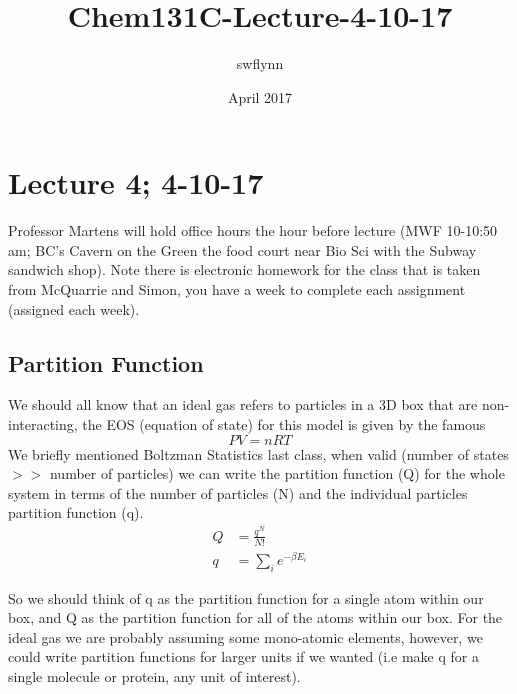 \documentclass{article}
\title{Chem131C-Lecture-4-10-17}
\author{swflynn }
\date{April 2017}
\begin{document}
\maketitle

\section*{Lecture 4; 4-10-17}
 Professor Martens will hold office hours the hour before lecture (MWF 10-10:50 am; BC’s Cavern on the Green the food court near Bio Sci with the Subway sandwich shop).
 Note there is electronic homework for the class that is taken from McQuarrie and Simon, you have a week to complete each assignment (assigned each week). 
 
 \subsection*{Partition Function}
 We should all know that an ideal gas refers to particles in a 3D box that are non-interacting, the EOS (equation of state) for this model is given by the famous 
 \begin{equation}
     PV = nRT
 \end{equation}
 We briefly mentioned Boltzman Statistics last class, when valid (number of states $>>$ number of particles) we can write the partition function (Q) for the whole system in terms of the number of particles (N) and the individual particles partition function (q). 
 \begin{equation}
 \begin{split}
     Q &= \frac{q^N}{N!} \\
     q &= \sum_i e^{-\beta E_i}
     \end{split}
 \end{equation}
 
 So we should think of q as the partition function for a single atom within our box, and Q as the partition function for all of the atoms within our box.
 For the ideal gas we are probably assuming some mono-atomic elements, however, we could write partition functions for larger units if we wanted (i.e make q for a single molecule or protein, any unit of interest).
\end{document}
